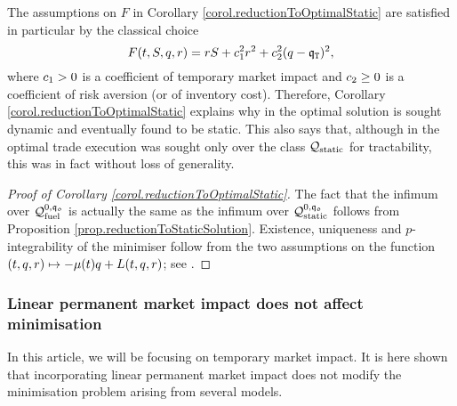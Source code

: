 \documentclass[10pt,a4paper]{article}
\begin{document}
\begin{remark}\label{remark.reductionToStaticSolutionInCarteaTextbook}
The assumptions on $F$ in Corollary \ref{corol.reductionToOptimalStatic} are satisfied in particular by the classical choice 
\begin{equation}\label{eq.classicalLagrangianWithLinearTemporaryImpact}
F(t,S, q,r)
=rS + c_{1}^{2}  r^{2} + c_{2}^{2} ( q - \mathfrak{q}_{\mathtt{T} })^{2} ,
\end{equation}
where $c_{1}>0$ is a coefficient of temporary market impact and $c_{2}\geq 0 $ is a coefficient of risk aversion (or of inventory cost). Therefore, Corollary \ref{corol.reductionToOptimalStatic} explains why in \cite[Section 6.3]{CJP15alg} the optimal solution is sought dynamic and eventually found to be static. This also says that, although in \cite{AC00opt} the optimal trade execution was sought only over the class $\mathcal{Q}_{\text{static}}$ for tractability, this was in fact without loss of generality.
\end{remark}

\begin{proof}[Proof of Corollary \ref{corol.reductionToOptimalStatic}]
The fact that the infimum over $\mathcal{Q}_{\text{fuel}}^{0,\mathfrak{q_0}}$ is actually the same as the infimum over $\mathcal{Q}_{\text{static}}^{0,\mathfrak{q_0}}$ follows from Proposition \ref{prop.reductionToStaticSolution}.  Existence, uniqueness and $p$-integrability of the minimiser follow from the two assumptions on the function $(t,q,r) \mapsto -\mu(t)q +L(t,q,r)$; see \cite[Theorem 4.1]{Dac08dir}.
\end{proof}





\subsubsection*{Linear permanent market impact does not affect minimisation}
In this article, we will be focusing on temporary market impact. It is here shown that incorporating linear permanent market impact does not modify the minimisation problem arising from several models. 
\end{document}
